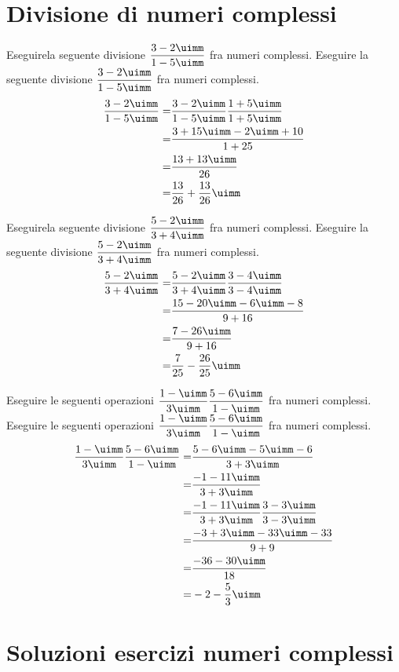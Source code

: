  \section{Divisione di  numeri complessi}
\begin{exercise}
	Eseguirela seguente divisione $\dfrac{3-2\uimm}{1-5\uimm}$ fra numeri complessi.
	\tcblower
	Eseguire la seguente divisione  $\dfrac{3-2\uimm}{1-5\uimm}$ fra numeri complessi.
	\begin{align*}
	\dfrac{3-2\uimm}{1-5\uimm}=&\dfrac{3-2\uimm}{1-5\uimm}\dfrac{1+5\uimm}{1+5\uimm}\\
	=&\dfrac{3+15\uimm-2\uimm+10}{1+25}\\
	=&\dfrac{13+13\uimm}{26}\\
	=&\dfrac{13}{26}+\dfrac{13}{26}\uimm\\
	\end{align*}
\end{exercise}
\begin{exercise}
	Eseguirela seguente divisione $\dfrac{5-2\uimm}{3+4\uimm}$ fra numeri complessi.
	\tcblower
	Eseguire la seguente divisione  $\dfrac{5-2\uimm}{3+4\uimm}$ fra numeri complessi.
	\begin{align*}
	\dfrac{5-2\uimm}{3+4\uimm}=&\dfrac{5-2\uimm}{3+4\uimm}\dfrac{3-4\uimm}{3-4\uimm}\\
	=&\dfrac{15-20\uimm-6\uimm-8}{9+16}\\
	=&\dfrac{7-26\uimm}{9+16}\\
	=&\dfrac{7}{25}-\dfrac{26}{25}\uimm\\
	\end{align*}
\end{exercise}
\begin{exercise}
	Eseguire le seguenti operazioni  $\dfrac{1-\uimm}{3\uimm}\dfrac{5-6\uimm}{1-\uimm}$ fra numeri complessi.
	\tcblower
	Eseguire le seguenti operazioni  $\dfrac{1-\uimm}{3\uimm}\dfrac{5-6\uimm}{1-\uimm}$ fra numeri complessi.
	\begin{align*}
	\dfrac{1-\uimm}{3\uimm}\dfrac{5-6\uimm}{1-\uimm}=&\dfrac{5-6\uimm-5\uimm-6}{3+3\uimm}\\
	=&\dfrac{-1-11\uimm}{3+3\uimm}\\
	=&\dfrac{-1-11\uimm}{3+3\uimm}\dfrac{3-3\uimm}{3-3\uimm}\\
	=&\dfrac{-3+3\uimm-33\uimm-33}{9+9}\\
	=&\dfrac{-36-30\uimm}{18}\\
	=&-2-\dfrac{5}{3}\uimm
	\end{align*}
\end{exercise}

\tcbstoprecording
 \newpage
 \section{Soluzioni esercizi numeri complessi}
 \tcbinputrecords